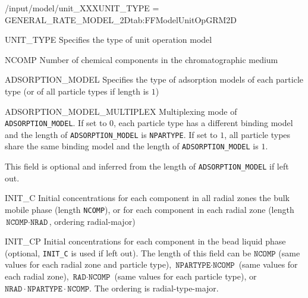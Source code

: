 \begin{condsubgroup}{/input/model/unit\_XXX}{UNIT\_TYPE = GENERAL\_RATE\_MODEL\_2D}{tab:FFModelUnitOpGRM2D}
  \begin{dataset}[type=string,range={\texttt{GENERAL\_RATE\_MODEL\_2D}},length=1]{UNIT\_TYPE}
    Specifies the type of unit operation model
  \end{dataset}
  \begin{dataset}[type=int,range={$\geq 1$},length=1]{NCOMP}
    Number of chemical components in the chromatographic medium
  \end{dataset}
  \begin{dataset}[type=string,range={See Section~\ref{sec:FFAdsorption}},length={$1$ / \texttt{NPARTYPE}}]{ADSORPTION\_MODEL}
    Specifies the type of adsorption models of each particle type (or of all particle types if length is $1$)
  \end{dataset}
  \begin{dataset}[unit=--,type=int,range={$\{0, 1\}$},length={1}]{ADSORPTION\_MODEL\_MULTIPLEX}
    Multiplexing mode of \texttt{ADSORPTION\_MODEL}.
    If set to $0$, each particle type has a different binding model and the length of \texttt{ADSORPTION\_MODEL} is \texttt{NPARTYPE}.
    If set to $1$, all particle types share the same binding model and the length of \texttt{ADSORPTION\_MODEL} is $1$.

    This field is optional and inferred from the length of \texttt{ADSORPTION\_MODEL} if left out.
  \end{dataset}
  \begin{dataset}[unit=\si{\mol\per\cubic\metre\of{IV}},type=double,range={$\geq 0$},length={$\texttt{NCOMP}$ / $\texttt{NCOMP} \cdot \texttt{NRAD}$}]{INIT\_C}
    Initial concentrations for each component in all radial zones the bulk mobile phase (length \texttt{NCOMP}), or for each component in each radial zone (length $\texttt{NCOMP} \cdot \texttt{NRAD}$, ordering radial-major)
  \end{dataset}
  \begin{dataset}[unit=\si{\mol\per\cubic\metre\of{MP}},type=double,range={$\geq 0$}]{INIT\_CP}
    Initial concentrations for each component in the bead liquid phase (optional, \texttt{INIT\_C} is used if left out).
    The length of this field can be $\texttt{NCOMP}$ (same values for each radial zone and particle type), $\texttt{NPARTYPE} \cdot \texttt{NCOMP}$ (same values for each radial zone), $\texttt{RAD} \cdot \texttt{NCOMP}$ (same values for each particle type), or $\texttt{NRAD} \cdot \texttt{NPARTYPE} \cdot \texttt{NCOMP}$.
    The ordering is radial-type-major.


\end{dataset}
\end{condsubgroup}
